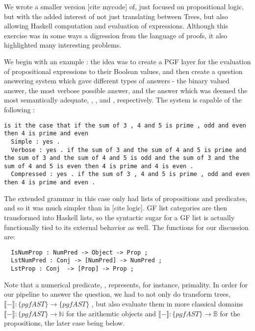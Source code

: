 We wrote a smaller version [cite mycode] of, just focused on propositional
logic, but with the added interest of not just translating between Trees, but
also allowing Haskell computation and evaluation of expressions. Although this
exercise was in some ways a digression from the language of proofs, it also
highlighted many interesting problems.  

We begin with an example : the idea was to create a PGF layer for the evaluation
of propositional expressions to their Boolean values, and then create a question
answering system which gave different types of answers - the binary valued
answer, the most verbose possible answer, and the answer which was deemed the
most semantically adequate, , , and
, respectively. The system is capable of the following :
\begin{verbatim}
is it the case that if the sum of 3 , 4 and 5 is prime , odd and even then 4 is prime and even
  Simple : yes .
  Verbose : yes . if the sum of 3 and the sum of 4 and 5 is prime and the sum of 3 and the sum of 4 and 5 is odd and the sum of 3 and the sum of 4 and 5 is even then 4 is prime and 4 is even .
  Compressed : yes . if the sum of 3 , 4 and 5 is prime , odd and even then 4 is prime and even .
\end{verbatim}

The extended grammar in this case only had lists of propositions and predicates,
and so it was much simpler than in [cite logic]. GF list categories are then
transformed into Haskell lists, so the syntactic sugar for a GF list is actually
functionally tied to its external behavior as well. The functions for our
discussion are:
\begin{verbatim}
  IsNumProp : NumPred -> Object -> Prop ;
  LstNumPred : Conj -> [NumPred] -> NumPred ; 
  LstProp : Conj  -> [Prop] -> Prop ;
\end{verbatim}

Note that a numerical predicate, , represents, for instance, primality.
In order for our pipeline to answer the
question, we had to not only do transform trees, $\llbracket - \rrbracket :
\{pgfAST\} \rightarrow \{pgfAST\}$
, but also evaluate them in more classical domains $\llbracket - \rrbracket : \{pgfAST\} \rightarrow
\mathds{N}$ for the arithemtic objects and $\llbracket - \rrbracket : \{pgfAST\} \rightarrow
\mathds{B}$ for the propositions, the later case being   below.

